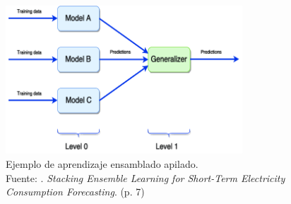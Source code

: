 \begin{figure}[!ht]
	\begin{center}
		\includegraphics[width=0.79\textwidth]{2/figures/stacking-ensemble-learning.png}
		\caption[Ejemplo de aprendizaje ensamblado apilado]{Ejemplo de aprendizaje ensamblado apilado.\\
			Fuente: \cite{tec_divina2018stackingensemblelearning}. \textit{Stacking Ensemble Learning for Short-Term Electricity Consumption Forecasting}. (p. 7)}
		\label{2:fig81}
	\end{center}
\end{figure}

